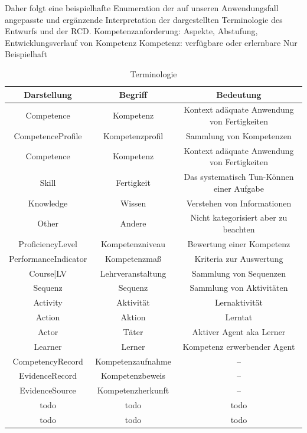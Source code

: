 \documentclass[
12pt,
english,
ngerman,
headsepline,
twoside,
openright,
numbers=noenddot,version=first
]{scrreprt}
\providecommand{\tabularnewline}{\\}
\begin{document}
Daher folgt eine beispielhafte Enumeration der auf unseren Anwendungsfall angepasste und ergänzende Interpretation der dargestellten Terminologie des Entwurfs und der RCD.
Kompetenzanforderung: 
Aspekte, Abstufung, Entwicklungsverlauf von Kompetenz
Kompetenz: verfügbare oder erlernbare
Nur Beispielhaft
\begin{table}[H]
	\caption{Terminologie}
	
	
	\noindent \centering{}\begin{tabular}{ccc}
		\hline 
		\noalign{\vskip\doublerulesep}
		Darstellung & Begriff & Bedeutung\tabularnewline[\doublerulesep]
		\hline
		\noalign{\vskip\doublerulesep}
		Competence & Kompetenz & Kontext adäquate Anwendung von Fertigkeiten \tabularnewline[\doublerulesep]
		\noalign{\vskip\doublerulesep}
		CompetenceProfile & Kompetenzprofil & Sammlung von Kompetenzen \tabularnewline[\doublerulesep]
		\noalign{\vskip\doublerulesep}
		Competence & Kompetenz & Kontext adäquate Anwendung von Fertigkeiten \tabularnewline[\doublerulesep]
		\noalign{\vskip\doublerulesep}
		Skill & Fertigkeit & Das systematisch Tun-Können einer Aufgabe \tabularnewline[\doublerulesep]
		\noalign{\vskip\doublerulesep}
		Knowledge & Wissen & Verstehen von Informationen
		\tabularnewline[\doublerulesep]
		\noalign{\vskip\doublerulesep}
		Other & Andere & Nicht kategorisiert aber zu beachten
		\tabularnewline[\doublerulesep]
		\noalign{\vskip\doublerulesep}
		ProficiencyLevel & Kompetenzniveau & Bewertung einer Kompetenz
		\tabularnewline[\doublerulesep]
		\noalign{\vskip\doublerulesep}
		PerformanceIndicator & Kompetenzmaß & Kriteria zur Auswertung
		\tabularnewline[\doublerulesep]
		\noalign{\vskip\doublerulesep}
		Course|LV & Lehrveranstaltung & Sammlung von Sequenzen
		\tabularnewline[\doublerulesep]
		\noalign{\vskip\doublerulesep}
		Sequenz & Sequenz & Sammlung von Aktivitäten
		\tabularnewline[\doublerulesep]
		\noalign{\vskip\doublerulesep}
		Activity & Aktivität & Lernaktivität
		\tabularnewline[\doublerulesep]
		\noalign{\vskip\doublerulesep}
		Action & Aktion & Lerntat
		\tabularnewline[\doublerulesep]
		\noalign{\vskip\doublerulesep}
		Actor & Täter & Aktiver Agent aka Lerner
		\tabularnewline[\doublerulesep]
		\noalign{\vskip\doublerulesep}
		Learner & Lerner & Kompetenz erwerbender Agent
		\tabularnewline[\doublerulesep]
		\noalign{\vskip\doublerulesep}
		CompetencyRecord & Kompetenzaufnahme & --
		\tabularnewline[\doublerulesep]
		\noalign{\vskip\doublerulesep}
		EvidenceRecord & Kompetenzbeweis & --
		\tabularnewline[\doublerulesep]
		\noalign{\vskip\doublerulesep}
		EvidenceSource & Kompetenzherkunft & --
		\tabularnewline[\doublerulesep]
		\noalign{\vskip\doublerulesep}
		todo & todo & todo
		\tabularnewline[\doublerulesep]
		\noalign{\vskip\doublerulesep}
		todo & todo & todo
		\tabularnewline[\doublerulesep]
		\hline
	\end{tabular}
\end{table}
\end{document}
